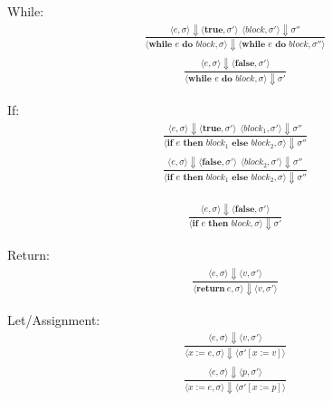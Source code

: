 \documentclass[12pt]{article}
\begin{document}
	
	While:
	\begin{align*}
		\frac{\langle e, \sigma \rangle\Downarrow \langle \textbf{true}, \sigma' \rangle \ \
		\langle block, \sigma' \rangle\Downarrow \sigma''}
		{\langle \textbf{while } e \textbf{ do } block, \sigma \rangle\Downarrow \langle \textbf{while } e \textbf{ do } block, \sigma'' \rangle}
	\end{align*}
	\begin{align*}
		\frac{\langle e, \sigma \rangle\Downarrow \langle \textbf{false}, \sigma' \rangle}
		{\langle \textbf{while } e \textbf{ do } block, \sigma \rangle\Downarrow \sigma'}
	\end{align*}

	If:
	\begin{align*}
		\frac{\langle e, \sigma \rangle\Downarrow \langle \textbf{true}, \sigma' \rangle \ \
		\langle block_1, \sigma' \rangle\Downarrow \sigma''}
		{\langle \textbf{if } e \textbf{ then } block_1 \textbf{ else } block_2, \sigma \rangle\Downarrow \sigma''}
	\end{align*}
	\begin{align*}
		\frac{\langle e, \sigma \rangle\Downarrow \langle \textbf{false}, \sigma' \rangle \ \
		\langle block_2, \sigma' \rangle\Downarrow \sigma''}
		{\langle \textbf{if } e \textbf{ then } block_1 \textbf{ else } block_2, \sigma \rangle\Downarrow \sigma''}
	\end{align*}

	\begin{align*}
		\frac{\langle e, \sigma \rangle\Downarrow \langle \textbf{false}, \sigma' \rangle}
		{\langle \textbf{if } e \textbf{ then } block, \sigma \rangle\Downarrow \sigma'}
	\end{align*}


	Return:
	\begin{align*}
		\frac{\langle e, \sigma \rangle\Downarrow \langle v, \sigma' \rangle}
		{\langle \textbf{return}\ e, \sigma \rangle\Downarrow \langle v, \sigma' \rangle}
	\end{align*}

	Let/Assignment:
	\begin{align*}
		\frac{\langle e, \sigma \rangle\Downarrow \langle v, \sigma' \rangle}
		{\langle x := e, \sigma \rangle\Downarrow \langle \sigma' [x := v] \rangle}
	\end{align*}
	\begin{align*}
		\frac{\langle e, \sigma \rangle\Downarrow \langle p, \sigma' \rangle}
		{\langle x := e, \sigma \rangle\Downarrow \langle \sigma' [x := p] \rangle}
	\end{align*}
\end{document}
